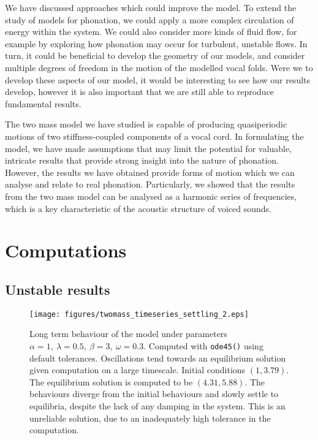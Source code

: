 \documentclass{report}
\begin{document}
We have discussed approaches which could improve the model.
To extend the study of models for phonation, we could apply a more complex circulation of energy within the system.
We could also consider more kinds of fluid flow,
for example by exploring how phonation may occur for turbulent, unstable flows.
In turn, it could be beneficial to develop the geometry of our models,
and consider multiple degrees of freedom in the motion of the modelled vocal folds.
Were we to develop these aspects of our model,
it would be interesting to see how our results develop,
however it is also important that we are still able to reproduce fundamental results.

The two mass model we have studied is capable of producing quasiperiodic motions of two stiffness-coupled components of a vocal cord.
In formulating the model,
we have made assumptions that may limit the potential for valuable, intricate results that provide strong insight into the nature of phonation.
However, the results we have obtained provide forms of motion which we can analyse and relate to real phonation.
Particularly, we showed that the results from the two mass model can be analysed as a harmonic series of frequencies,
which is a key characteristic of the acoustic structure of voiced sounds.




\appendix


\chapter{Computations}

\section{Unstable results}

\begin{figure}[h!]
	\centering
	\texttt{[image: figures/twomass\_timeseries\_settling\_2.eps]}
	\caption{
		Long term behaviour of the model under parameters \(\alpha=1,~\lambda=0.5,~\beta=3,~\omega=0.3\).
		Computed with \texttt{ode45()} using default tolerances.
		Oscillations tend towards an equilibrium solution given computation on a large timescale.
		Initial conditions \((1,3.79)\).
		The equilibrium solution is computed to be $(4.31,5.88)$.
		The behaviours diverge from the initial behaviours and slowly settle to equilibria,
		despite the lack of any damping in the system.
		This is an unreliable solution, due to an inadequately high tolerance in the computation.
	}
	\label{fig:twomass_timeseries_settling}
\end{figure}
\end{document}
